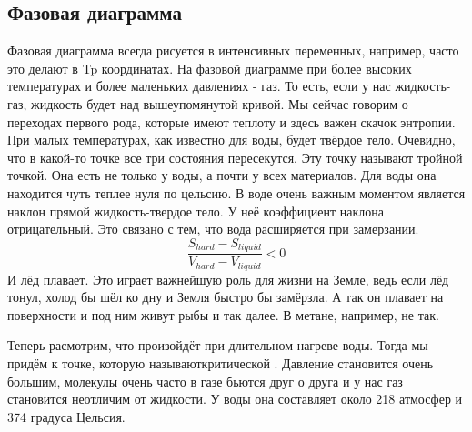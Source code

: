 \documentclass[a4paper, 12pt]{article}
\begin{document}
	\subsection{Фазовая диаграмма}
	Фазовая диаграмма всегда рисуется в интенсивных переменных, например, часто это делают в Tp координатах. На фазовой диаграмме при более высоких температурах и более маленьких давлениях - газ. То есть, если у нас жидкость-газ, жидкость будет над вышеупомянутой кривой. Мы сейчас говорим о переходах первого рода, которые имеют теплоту и здесь важен скачок энтропии. При малых температурах, как известно для воды, будет твёрдое тело. Очевидно, что в какой-то точке все три состояния пересекутся. Эту точку называют тройной точкой. Она есть не только у воды, а почти у всех материалов. Для воды она находится чуть теплее нуля по цельсию. В воде очень важным моментом является наклон прямой жидкость-твердое тело. У неё коэффициент наклона отрицательный. Это связано с тем, что вода расширяется при замерзании.
	\begin{equation*}
		\frac{S_{hard}-S_{liquid}}{V_{hard}-V_{liquid}} < 0 
	\end{equation*}
	И лёд плавает. Это играет важнейшую роль для жизни на Земле, ведь если лёд тонул, холод бы шёл ко дну и Земля быстро бы замёрзла. А так он плавает на поверхности и под ним живут рыбы и так далее. В метане, например, не так. 
	
	Теперь расмотрим, что произойдёт при длительном нагреве воды. Тогда мы придём к точке, которую называюткритической . Давление становится очень большим, молекулы очень часто в газе бьются друг о друга и у нас газ становится неотличим от жидкости. У воды она составляет около 218 атмосфер и 374 градуса Цельсия.
	
\end{document}

